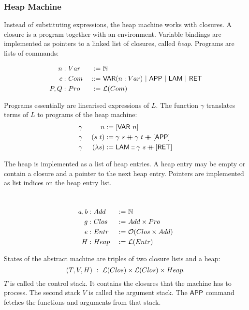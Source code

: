 \subsubsection{Heap Machine}
\label{sec:heap-def}
%

Instead of substituting expressions, the heap machine works with closures.  A closure is a program together with an environment.  Variable bindings
are implemented as pointers to a linked list of closures, called \textit{heap}.  Programs are lists of commands:
\begin{definition}[Program][Pro]
  \label{def:Com}
  \begin{alignat*}{2}
    n:   &~Var  &~:=~& \mathbb{N} \\
    c:   &~Com  &~::=~& \mathsf{VAR}(n:Var) ~|~ \mathsf{APP} ~|~ \mathsf{LAM} ~|~ \mathsf{RET} \\
    P,Q: &~Pro  &~:=~& \mathcal{L}(Com)
  \end{alignat*}
\end{definition}

Programs essentially are linearised expressions of $L$.  The function $\gamma$ translates terms of $L$ to programs of the heap machine:
\begin{alignat*}{2}
  &\gamma&~n           &:= [\mathsf{VAR}~n] \\
  &\gamma&~(s~t)       &:= \gamma~s \mathbin{+\mkern-10mu+} \gamma~t \mathbin{+\mkern-10mu+} [\mathsf{APP}] \\
  &\gamma&~(\lambda s) &:= \mathsf{LAM} \mathbin{::} \gamma~s \mathbin{+\mkern-10mu+} [\mathsf{RET}]
\end{alignat*}

The heap is implemented as a list of heap entries.  A heap entry may be empty or contain a closure and a pointer to the next heap entry.  Pointers are
implemented as list indices on the heap entry list.
\begin{definition}
  \label{def:Heap}
  ~
  \begin{alignat*}{2}
    a,b: &~Add  &~:=~& \mathbb{N} \\
    g:   &~Clos &~:=~& Add \times Pro \\
    e:   &~Entr &~:=~& \mathcal{O}(Clos \times Add) \\
    H:   &~Heap &~:=~& \mathcal{L}(Entr)
  \end{alignat*}
\end{definition}

States of the abstract machine are triples of two closure lists and a heap:
\[
  (T, V, H) ~:~ \mathcal{L}(Clos) \times \mathcal{L}(Clos) \times Heap.
\]
$T$ is called the control stack.  It contains the closures that the machine has to process.  The second stack $V$ is called the argument stack.  The
$\mathsf{APP}$ command fetches the functions and arguments from that stack.


